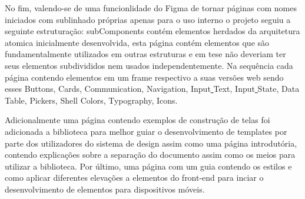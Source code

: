   No fim, valendo-se de uma funcionlidade do Figma de tornar páginas com nomes iniciados com sublinhado próprias apenas para o uso interno o projeto seguiu a seguinte estruturação: \underline{ }subComponents contém elementos herdados da arquitetura atomica inicialmente desenvolvida, esta página contém elementos que são fundamentalmente utilizados em outras estruturas e em tese não deveriam ter seus elementos subdivididos nem usados independentemente. Na sequência cada página contendo elementos em um frame respectivo a suas versões web sendo esses Buttons, Cards, Communication, Navigation, Input\underline{ }Text, Input\underline{ }State, Data\underline{ }Table, Pickers, Shell Colors, Typography, Icons.

  Adicionalmente uma página contendo exemplos de construção de telas foi adicionada a biblioteca para melhor guiar o desenvolvimento de templates por parte dos utilizadores do sistema de design assim como uma página introdutória, contendo explicações sobre a separação do documento assim como os meios para utilizar a biblioteca. Por último, uma página com um guia contendo os estilos e como aplicar diferentes elevações a elementos do front-end para inciar o desenvolvimento de elementos para dispositivos móveis.